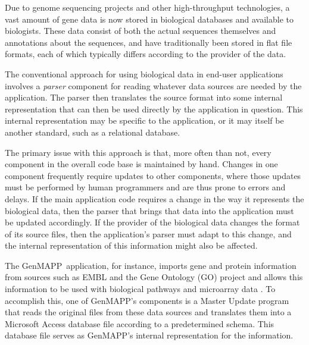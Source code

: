 \documentclass[10pt]{bmc_article}
\newenvironment{bmcformat}{\begin{raggedright}\baselineskip20pt\sloppy\setboolean{publ}{false}}{\end{raggedright}\baselineskip20pt\sloppy}
\def\genmapp{GenMAPP}                  %
\begin{document}
\begin{bmcformat}

Due to genome sequencing projects and other high-throughput technologies, a vast amount of gene data is now stored in biological databases and available to biologists.  These data consist of both the actual sequences themselves and annotations about the sequences, and have traditionally been stored in flat file formats, each of which typically differs according to the provider of the data.\pb

The conventional approach for using biological data in end-user applications involves a \emph{parser} component for reading whatever data sources are needed by the application.  The parser then translates the source format into some internal representation that can then be used directly by the application in question.  This internal representation may be specific to the application, or it may itself be another standard, such as a relational database.\pb

The primary issue with this approach is that, more often than not, every component in the overall code base is maintained by hand.  Changes in one component frequently require updates to other components, where those updates must be performed by human programmers and are thus prone to errors and delays.  If the main application code requires a change in the way it represents the biological data, then the parser that brings that data into the application must be updated accordingly.  If the provider of the biological data changes the format of its source files, then the application's parser must adapt to this change, and the internal representation of this information might also be affected.\pb

The \genmapp\ application, for instance, imports gene and protein information from sources such as EMBL and the Gene Ontology (GO) project and allows this information to be used with biological pathways and microarray data \cite{genmapp:ng,genmapp:bax}.  To accomplish this, one of \genmapp's components is a Master Update program that reads the original files from these data sources and translates them into a Microsoft Access database file according to a predetermined schema.  This database file serves as \genmapp's internal representation for the information.\pb


\end{bmcformat}
\end{document}
